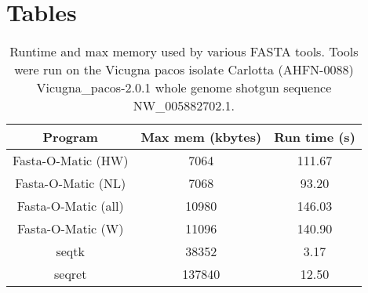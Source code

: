 \section*{Tables}
\begin{table} 
    \begin{tabular}{ c c c }
        Program & Max mem (kbytes) & Run time (s) \\ \hline
        Fasta-O-Matic (HW) & 7064 & 111.67 \\ 
        Fasta-O-Matic (NL) & 7068 & 93.20 \\ 
        Fasta-O-Matic (all) & 10980 & 146.03 \\ 
        Fasta-O-Matic (W) & 11096 & 140.90 \\ 
        seqtk & 38352 & 3.17 \\ 
        seqret & 137840 & 12.50 \\
    \end{tabular} 
    \caption{Runtime and max memory used by various FASTA tools. Tools were run on the Vicugna pacos isolate Carlotta (AHFN-0088) Vicugna_pacos-2.0.1 whole genome shotgun sequence NW_005882702.1.} 
\end{table}

  
  
  
  
  
  
  
  
  
  